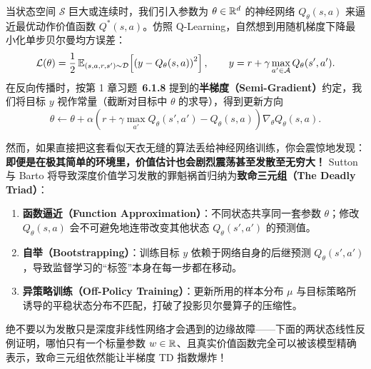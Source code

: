 当状态空间 $\mathcal{S}$ 巨大或连续时，我们引入参数为 $\theta \in \mathbb{R}^d$ 的神经网络 $Q_\theta(s, a)$ 来逼近最优动作价值函数 $Q^*(s, a)$。仿照 Q-Learning，自然想到用随机梯度下降最小化单步贝尔曼均方误差：
\begin{equation}
  \mathcal{L}(\theta) = \frac{1}{2}\,\mathbb{E}_{(s, a, r, s') \sim \mathcal{D}}\!\left[\left(y - Q_\theta(s, a)\right)^2\right], \qquad
  y = r + \gamma \max_{a' \in \mathcal{A}} Q_\theta(s', a').
  \label{eq:naive-dqn-loss}
\end{equation}
在反向传播时，按第 1 章习题~\textbf{6.1.8} 提到的\textbf{半梯度（Semi-Gradient）}约定，我们将目标 $y$ 视作常量（截断对目标中 $\theta$ 的求导），得到更新方向
\[
  \theta \leftarrow \theta + \alpha \!\left(r + \gamma \max_{a'} Q_\theta(s', a') - Q_\theta(s, a)\right) \nabla_\theta Q_\theta(s, a).
\]

然而，如果直接把这套看似天衣无缝的算法丢给神经网络训练，你会震惊地发现：\textbf{即便是在极其简单的环境里，价值估计也会剧烈震荡甚至发散至无穷大！} Sutton 与 Barto 将导致深度价值学习发散的罪魁祸首归纳为\textbf{致命三元组（The Deadly Triad）}：
\begin{enumerate}
  \item \textbf{函数逼近（Function Approximation）}：不同状态共享同一套参数 $\theta$；修改 $Q_\theta(s, a)$ 会不可避免地连带改变其他状态 $Q_\theta(s', a')$ 的预测值。
  \item \textbf{自举（Bootstrapping）}：训练目标 $y$ 依赖于网络自身的后继预测 $Q_\theta(s', a')$，导致监督学习的“标签”本身在每一步都在移动。
  \item \textbf{异策略训练（Off-Policy Training）}：更新所用的样本分布 $\mu$ 与目标策略所诱导的平稳状态分布不匹配，打破了投影贝尔曼算子的压缩性。
\end{enumerate}

绝不要以为发散只是深度非线性网络才会遇到的边缘故障——下面的两状态线性反例证明，哪怕只有一个标量参数 $w \in \mathbb{R}$、且真实价值函数完全可以被该模型精确表示，致命三元组依然能让半梯度 TD 指数爆炸！

